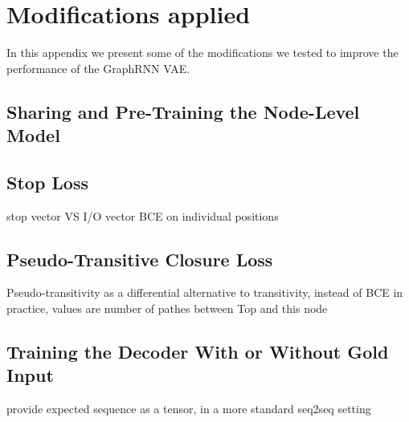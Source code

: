 \chapter{Modifications applied} %
\label{app:graphrnn-mods}

In this appendix we present some of the modifications we tested to improve the performance of the GraphRNN VAE.

\section{Sharing and Pre-Training the Node-Level Model}

\section{Stop Loss}
stop vector VS I/O vector
BCE on individual positions

\section{Pseudo-Transitive Closure Loss}
Pseudo-transitivity as a differential alternative to transitivity, instead of BCE
in practice, values are number of pathes between Top and this node

\section{Training the Decoder With or Without Gold Input}
provide expected sequence as a tensor, in a more standard seq2seq setting
